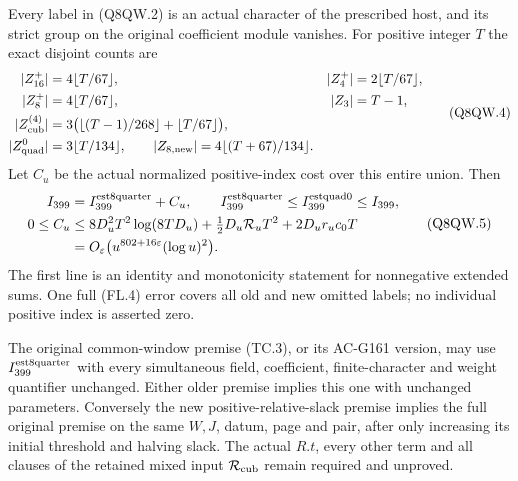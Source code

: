\begin{theorem}
\label{AC-G159-window}
Every label in (Q8QW.2) is an actual character of the prescribed
host, and its strict group on the original coefficient module
vanishes.  For positive integer $T$ the exact disjoint counts are
\[
 \begin{aligned}
 |Z_{16}^+|&=4\lfloor T/67\rfloor,& |Z_4^+|&=2\lfloor T/67\rfloor,\\
 |Z_8^+|&=4\lfloor T/67\rfloor,& |Z_3|&=T-1,\\
 |Z_{\rm cub}^{(4)}|&=3\bigl(\lfloor(T-1)/268\rfloor
                                      +\lfloor T/67\rfloor\bigr),\\
 |Z_{\rm quad}^0|&=3\lfloor T/134\rfloor,\qquad
 |Z_{8,\mathrm{new}}|=4\lfloor(T+67)/134\rfloor.
 \end{aligned}
 \tag{Q8QW.4}
\]
Let $C_u$ be the actual normalized positive-index cost over
this entire union.  Then
\[
 \begin{aligned}
 I_{399}&=I_{399}^{\rm est8quarter}+C_u,\qquad
 I_{399}^{\rm est8quarter}\leq I_{399}^{\rm estquad0}\leq I_{399},\\
 0\leq C_u&\leq8D_u^2T^2\log(8TD_u)
                   +\tfrac12D_u\mathcal R_uT^2+2D_ur_uc_0T\\
 &=O_\varepsilon\bigl(u^{802+16\varepsilon}(\log u)^2\bigr).
 \end{aligned}
 \tag{Q8QW.5}
\]
The first line is an identity and monotonicity statement for
nonnegative extended sums.
One full (FL.4) error covers all old and new omitted labels;
no individual positive index is asserted zero.

The original common-window premise (TC.3), or its AC-G161 version,
may use $I_{399}^{\rm est8quarter}$ with every simultaneous field,
coefficient, finite-character and weight quantifier unchanged.
Either older premise implies this one with unchanged parameters.
Conversely the new positive-relative-slack premise implies the
full original premise on the same $W,J$, datum, page and pair,
after only increasing its initial threshold and halving slack.
The actual $R.t$, every other term and all clauses of the retained
mixed input $\mathcal R_{\rm cub}$ remain required and unproved.
\end{theorem}

